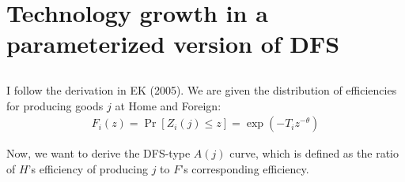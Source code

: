 \documentclass[12pt]{article}
\begin{document}
\newpage


\section{Technology growth in a parameterized version of DFS}

\subsection{}
I follow the derivation in EK (2005). We are given the distribution of efficiencies for producing goods $j$ at Home and Foreign:
\begin{align*}
F_i(z)=\Pr[Z_i(j) \leq z ] = \exp(-T_iz^{-\theta})
\end{align*}

Now, we want to derive the DFS-type $A(j)$ curve, which is defined as the ratio of $H$'s efficiency of producing $j$ to $F$'s corresponding efficiency.\\
\end{document}
